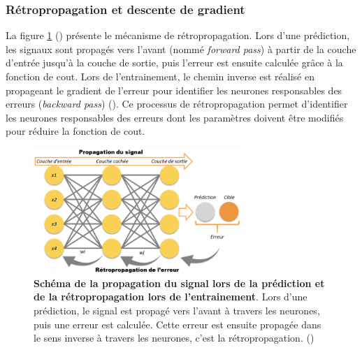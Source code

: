 \subsubsection{Rétropropagation et descente de gradient}
La figure \ref{fig:retropop} (\cite{scalzitti_nouvelle_2021}) présente le mécanisme de rétropropagation. Lors d'une prédiction, les signaux sont propagés vers l'avant (nommé \textit{forward pass}) à partir de la couche d'entrée jusqu'à la couche de sortie, puis l'erreur est ensuite calculée grâce à la fonction de cout. Lors de l'entrainement, le chemin inverse est réalisé en propageant le gradient de l'erreur pour identifier les neurones responsables des erreurs (\textit{backward pass}) (\cite{lecun_deep_2015}). Ce processus de rétropropagation permet d'identifier les neurones responsables des erreurs dont les paramètres doivent être modifiés pour réduire la fonction de cout.
\begin{figure}[!ht]
 \centering
 \includegraphics[width=0.7\textwidth]{figures/retro_propagation.png}
 \caption[Schéma de la rétro-propagation]{\textbf{Schéma de la propagation du signal lors de la prédiction et de la rétropropagation lors de l'entrainement}. Lors d'une prédiction, le signal est propagé vers l'avant à travers les neurones, puis une erreur est calculée. Cette erreur est ensuite propagée dans le sens inverse à travers les neurones, c'est la rétropropagation. (\cite{scalzitti_nouvelle_2021})}
 \label{fig:retropop}
\end{figure}


